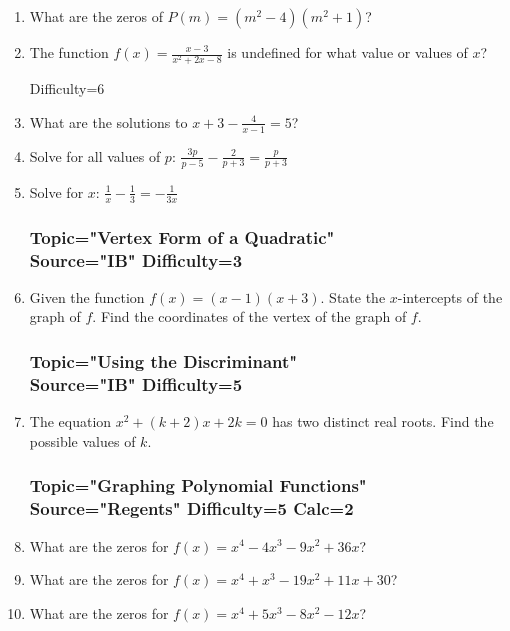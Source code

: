 \documentclass[12pt, oneside]{article}
\begin{document}
\begin{enumerate}
\item What are the zeros of $P(m) = (m^2 - 4)(m^2+ 1)$? %

\item The function $\displaystyle f(x)=\frac{x-3}{x^2+2x-8}$ is undefined for what value or values of $x$? %

Difficulty=6
\item What are the solutions to $\displaystyle x+3- \frac{4}{x-1} =5$? %

\item Solve for all values of $p$: $\displaystyle \frac{3p}{p-5} - \frac{2}{p+3} =\frac{p}{p+3}$ %

\item Solve for $x$: $\displaystyle \frac{1}{x} - \frac{1}{3} =-\frac{1}{3x}$ %

\subsubsection*{Topic="Vertex Form of a Quadratic"\\
Source="IB" 
Difficulty=3}

\item Given the function $f(x)=(x-1)(x+3)$. State the $x$-intercepts of the graph of $f$. Find the coordinates of the vertex of the graph of $f$.


\subsubsection*{Topic="Using the Discriminant"\\
Source="IB" 
Difficulty=5}

\item The equation $x^2+(k+2)x+2k=0$ has two distinct real roots. Find the possible values of $k$.

\subsubsection*{Topic="Graphing Polynomial Functions"\\
Source="Regents" 
Difficulty=5 Calc=2}

\item What are the zeros for $f(x)=x^4-4x^3-9x^2+36x$? %
\item What are the zeros for $f(x)=x^4+x^3-19x^2+11x+30$?
\item What are the zeros for $f(x)=x^4+5x^3-8x^2-12x$?


\end{enumerate}
\end{document}
